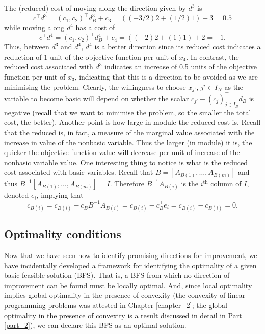 The (reduced) cost of moving along the direction given by $d^3$ is 
%
\begin{equation*}
	c^\top d^3 = (c_1, c_2)^\top d_B^3 + c_3 = ((-3/2)2 + (1/2)1) + 3 = 0.5
\end{equation*}
%
while moving along $d^4$ has a cost of
\begin{equation*}
	c^\top d^4 = (c_1, c_2)^\top d_B^4 + c_4 = ((-2)2 + (1)1) + 2 = -1.
\end{equation*}
%
Thus, between $d^3$ and $d^4$, $d^4$ is a better direction since its reduced cost indicates a reduction of $1$ unit of the objective function per unit of $x_4$. In contrast, the reduced cost associated with $d^3$ indicates an increase of 0.5 units of the objective function per unit of $x_3$, indicating that this is a direction to be avoided as we are minimising the problem.
%
Clearly, the willingness to choose $x_{j'}$, $j' \in I_N$ as the variable to become basic will depend on whether the scalar $c_{j'} - (c_j)_{j \in I_B}^\top d_B$ is negative (recall that we want to minimise the problem, so the smaller the total cost, the better). Another point is how large in module the reduced cost is. Recall that the reduced is, in fact, a measure of the marginal value associated with the increase in value of the nonbasic variable. Thus the larger (in module) it is, the quicker the objective function value will decrease per unit of increase of the nonbasic variable value.
%
One interesting thing to notice is what is the reduced cost associated with basic variables. Recall that $B = [A_{B(1)}, \dots, A_{B(m)}]$ and thus $B^{-1}[A_{B(1)}, \dots, A_{B(m)}] = I$. Therefore $B^{-1}A_{B(i)}$ is the $i^\text{th}$ column of $I$, denoted $e_i$, implying that
%
\begin{equation*}
	\overline{c}_{B(i)} = c_{B(i)} - c^\top_B B^{-1} A_{B(i)} = c_{B(i)} - c_B^\top e_i = c_{B(i)} - c_{B(i)} = 0.	
\end{equation*}


\subsection{Optimality conditions}

Now that we have seen how to identify promising directions for improvement, we have incidentally developed a framework for identifying the optimality of a given basic feasible solution (BFS). That is, a BFS from which no direction of improvement can be found must be locally optimal. And, since local optimality implies global optimality in the presence of convexity (the convexity of linear programming problems was attested in Chapter \ref{chapter_2}; the global optimality in the presence of convexity is a result discussed in detail in Part \ref{part_2}), we can declare this BFS as an optimal solution. 


